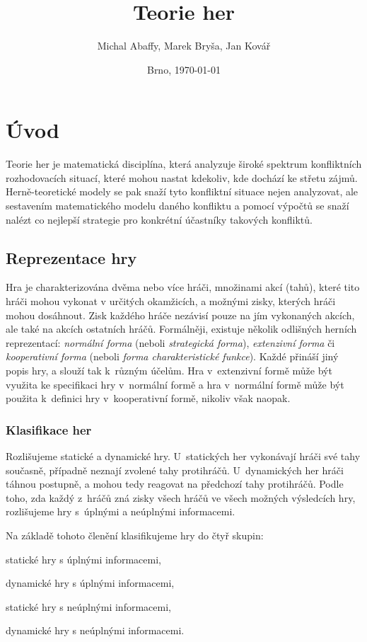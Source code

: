 \documentclass[a5paper,12pt]{article}
\title{Teorie her}
\author{Michal Abaffy, Marek Bryša, Jan Kovář}
\date{Brno, \today}
\begin{document}
  \maketitle
  \section{Úvod}
    Teorie her je matematická disciplína, která analyzuje široké spektrum konfliktních rozhodovacích situací, které mohou nastat kdekoliv, kde dochází ke střetu zájmů. Herně-teoretické modely se pak snaží tyto konfliktní situace nejen analyzovat, ale sestavením matematického modelu daného konfliktu a pomocí výpočtů se snaží nalézt co nejlepší strategie pro konkrétní účastníky takových konfliktů.

    \subsection{Reprezentace hry}
    Hra je charakterizována dvěma nebo více hráči, množinami akcí (tahů), které tito hráči mohou vykonat v určitých okamžicích, a možnými zisky, kterých hráči mohou dosáhnout. Zisk každého hráče nezávisí pouze na jím vykonaných akcích, ale také na akcích ostatních hráčů. Formálněji, existuje několik odlišných herních reprezentací: \emph{normální forma} (neboli \emph{strategická forma}), \emph{extenzivní forma} či \emph{kooperativní forma} (neboli \emph{forma charakteristické funkce}). Každé přináší jiný popis hry, a slouží tak k~různým účelům. Hra v~extenzivní formě může být využita ke specifikaci hry v~normální formě a hra v~normální formě může být použita k~definici hry v~kooperativní formě, nikoliv však naopak.

    \subsubsection{Klasifikace her}
    Rozlišujeme statické a dynamické hry. U~statických her vykonávají hráči své tahy současně, případně neznají zvolené tahy protihráčů. U~dynamických her hráči táhnou postupně, a mohou tedy reagovat na předchozí tahy protihráčů. Podle toho, zda každý z~hráčů zná zisky všech hráčů ve všech možných výsledcích hry, rozlišujeme hry s~úplnými a neúplnými informacemi.
       
    Na základě tohoto členění klasifikujeme hry do čtyř skupin:
    \begin{compactitem}
    \item statické hry s úplnými informacemi,
    \item dynamické hry s úplnými informacemi,
    \item statické hry s neúplnými informacemi,
    \item dynamické hry s neúplnými informacemi.
    \end{compactitem}
\end{document}
